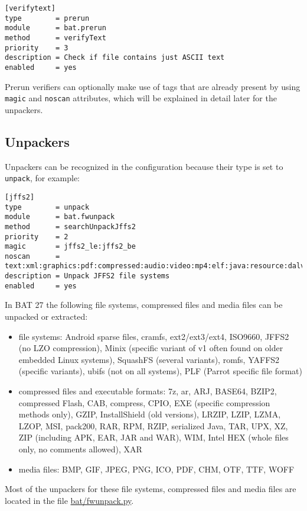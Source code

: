 \documentclass[10pt,a4paper]{article}
\begin{document}
\begin{verbatim}
[verifytext]
type        = prerun
module      = bat.prerun
method      = verifyText
priority    = 3
description = Check if file contains just ASCII text
enabled     = yes
\end{verbatim}

Prerun verifiers can optionally make use of tags that are already present by
using \texttt{magic} and \texttt{noscan} attributes, which will be explained
in detail later for the unpackers.

\subsection{Unpackers}

Unpackers can be recognized in the configuration because their type is set
to \texttt{unpack}, for example:

\begin{verbatim}
[jffs2]
type        = unpack
module      = bat.fwunpack
method      = searchUnpackJffs2
priority    = 2
magic       = jffs2_le:jffs2_be
noscan      = text:xml:graphics:pdf:compressed:audio:video:mp4:elf:java:resource:dalvik
description = Unpack JFFS2 file systems
enabled     = yes
\end{verbatim}

In BAT 27 the following file systems, compressed files and media files can be
unpacked or extracted:

\begin{itemize}
\item file systems: Android sparse files, cramfs, ext2/ext3/ext4, ISO9660,
JFFS2 (no LZO compression), Minix (specific variant of v1 often found on older
embedded Linux systems), SquashFS (several variants), romfs, YAFFS2 (specific
variants), ubifs (not on all systems), PLF (Parrot specific file format)
\item compressed files and executable formats: 7z, ar, ARJ, BASE64, BZIP2,
compressed Flash, CAB, compress, CPIO, EXE (specific compression methods only),
GZIP, InstallShield (old versions), LRZIP, LZIP, LZMA, LZOP, MSI, pack200, RAR,
RPM, RZIP, serialized Java, TAR, UPX, XZ, ZIP (including APK, EAR, JAR and
WAR), WIM, Intel HEX (whole files only, no comments allowed), XAR
\item media files: BMP, GIF, JPEG, PNG, ICO, PDF, CHM, OTF, TTF, WOFF
\end{itemize}

Most of the unpackers for these file systems, compressed files and media files
are located in the file \url{bat/fwunpack.py}.
\end{document}
